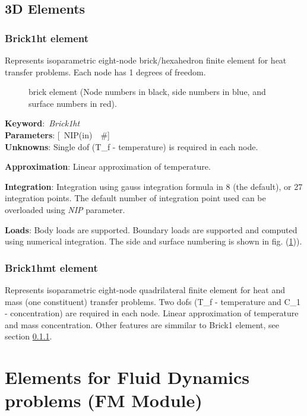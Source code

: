 \documentclass[12pt,dvips]{article}
\newcommand{\descitem}[1]{{\noindent \bf #1}:}
\newcommand{\elemkeyword}[1]{\descitem{Keyword}~{\em #1}}
\newcommand{\elemparam}[2]{{{#1\tiny (#2)}~~\#}}
\newcommand{\optelemparam}[2]{{[~\elemparam{#1}{#2}]}}
\newcommand{\param}[1]{{\it #1}}
\begin{document}
\subsection{3D Elements}
\subsubsection{Brick1ht element}
\label{Brick1ht}
Represents isoparametric eight-node brick/hexahedron finite element for
heat transfer problems. Each node has 1 degrees of freedom.
\begin{figure}[tb]
\centerline{}
\caption{brick element (Node numbers in black, side numbers in blue,
and surface numbers in red).}
\label{Brick1htfig}
\end{figure}

\elemkeyword{Brick1ht}\\
\descitem{Parameters} \optelemparam{NIP}{in}\\
\descitem{Unknowns}
Single dof (T\_f - temperature) is required in each node.

\descitem{Approximation} Linear approximation of temperature.

\descitem{Integration}
Integration using gauss integration formula
in 8 (the default), or 27 integration points. The default number of
integration point used can be overloaded using \param{NIP} parameter.

\descitem{Loads} Body loads are supported. Boundary loads are
supported and computed using numerical integration. The side and
surface numbering is shown in fig. (\ref{Brick1htfig})).

\subsubsection{Brick1hmt element}
Represents isoparametric eight-node quadrilateral finite element for
heat and mass (one constituent) transfer problems. 
Two dofs (T\_f - temperature and C\_1 - concentration) are required in
each node. Linear approximation of temperature and mass concentration.
Other features are simmilar to Brick1 element, see section \ref{Brick1ht}.

\section{Elements for Fluid Dynamics problems (FM Module)}
\end{document}
